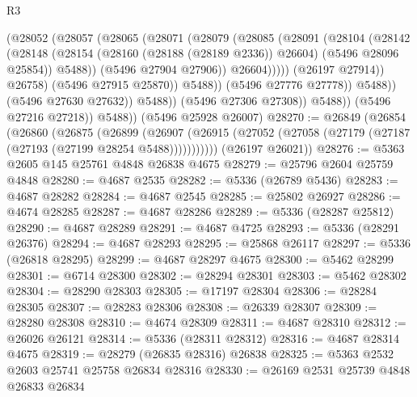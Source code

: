 \begin{lexlean}{R3}
\begin{coremodule}
                                  (@28052
                                    (@28057
                                      (@28065
                                        (@28071
                                          (@28079
                                            (@28085
                                              (@28091
                                                (@28104
                                                  (@28142
                                                    (@28148
                                                      (@28154
                                                        (@28160 (@28188 (@28189 @2336)) @26604)
                                                        (@5496 @28096 @25854))
                                                      @5488))
                                                  (@5496 @27904 @27906))
                                                @26604)))))
                                      (@26197 @27914))
                                    @26758)
                                  (@5496 @27915 @25870))
                                @5488))
                            (@5496 @27776 @27778))
                          @5488))
                      (@5496 @27630 @27632))
                    @5488))
                (@5496 @27306 @27308))
              @5488))
          (@5496 @27216 @27218))
        @5488))
    (@5496 @25928 @26007)
@28270 := @26849
    (@26854
      (@26860
        (@26875
          (@26899
            (@26907 (@26915 (@27052 (@27058 (@27179 (@27187 (@27193 (@27199 @28254 @5488)))))))))))
      (@26197 @26021))
@28276 := @5363 @2605 @145 @25761 @4848 @26838 @4675
@28279 := @25796 @2604 @25759 @4848
@28280 := @4687 @2535
@28282 := @5336 (@26789 @5436)
@28283 := @4687 @28282
@28284 := @4687 @2545
@28285 := @25802 @26927
@28286 := @4674 @28285
@28287 := @4687 @28286
@28289 := @5336 (@28287 @25812)
@28290 := @4687 @28289
@28291 := @4687 @4725
@28293 := @5336 (@28291 @26376)
@28294 := @4687 @28293
@28295 := @25868 @26117
@28297 := @5336 (@26818 @28295)
@28299 := @4687 @28297 @4675
@28300 := @5462 @28299
@28301 := @6714 @28300
@28302 := @28294 @28301
@28303 := @5462 @28302
@28304 := @28290 @28303
@28305 := @17197 @28304
@28306 := @28284 @28305
@28307 := @28283 @28306
@28308 := @26339 @28307
@28309 := @28280 @28308
@28310 := @4674 @28309
@28311 := @4687 @28310
@28312 := @26026 @26121
@28314 := @5336 (@28311 @28312)
@28316 := @4687 @28314 @4675
@28319 := @28279 (@26835 @28316) @26838
@28325 := @5363 @2532 @2603 @25741 @25758 @26834 @28316
@28330 := @26169 @2531 @25739 @4848 @26833 @26834

\end{coremodule}
\end{lexlean}
